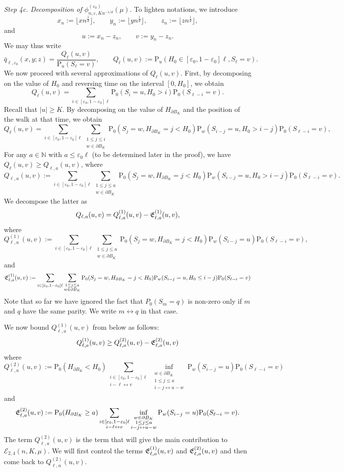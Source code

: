 \documentclass[a4paper,11pt]{amsart}
\numberwithin{equation}{section}
\newcommand{\bbN}{{\ensuremath{\mathbb N}} }
\newcommand{\cE}{{\ensuremath{\mathcal E}} }
\newcommand{\gep}{\varepsilon}
\newcommand{\infthree}[3]{\inf_{\substack{#1 \\ #2\\ #3\\}}} %
\newcommand{\sumtwo}[2]{\sum_{\substack{#1 \\ #2}}} %
\newcommand\bP{\ensuremath{\mathrm{P}}}
\newcommand{\8}{\infty}
\newcommand{\beq}{\begin{equation}}
\newcommand{\eeq}{\end{equation}}
\newcommand{\lra}{\leftrightarrow}
\begin{document}
{\it Step 4c. Decomposition of $\phi^{(\gep_0)}_{n,\gep, Kn^{-1/d}}(\mu)$.}  To lighten notations, we introduce
\beq
x_n := \lfloor xn^{\frac1d} \rfloor, \qquad
y_n := \lfloor yn^{\frac1d} \rfloor, \qquad
z_n := \lfloor zn^{\frac1d} \rfloor,
\eeq
and
\beq
\label{eq:def-uv}
u:= x_n - z_n, \qquad v := y_n- z_n.
\eeq
We may thus write
\beq
\bar q_{\ell,\gep_0}(x,y;z) = \frac{Q_{\ell}(u,v)}{\bP_u(S_\ell = v)},
\qquad Q_{\ell}(u,v):= \bP_u(H_0\in[\gep_0,1-\gep_0]\ell, S_{\ell}= v).
\eeq
We now proceed with several approximations of $Q_{\ell}(u,v)$. First, by decomposing on the value of $H_0$ and reversing time on the interval $[0,H_0]$, we obtain
\beq
Q_{\ell}(u,v) = \sum_{i \in [\gep_0,1-\gep_0]\ell} \bP_0(S_i = u, H_0>i) \bP_0(S_{\ell - i}= v).
\eeq
Recall that $|u|\ge K$. By decomposing on the value of $H_{\partial B_K}$ and the position of the walk at that time, we obtain
\beq
Q_{\ell}(u,v) = \sum_{i \in [\gep_0,1-\gep_0]\ell} \sumtwo{1\le j \le i}{w\in \partial B_K} \bP_0(S_j=w, H_{\partial B_K}=j < H_0)\bP_w(S_{i-j} = u, H_0>i-j) \bP_0(S_{\ell - i}= v),
\eeq
For any $a\in\bbN$ with $a\leq \gep_0\ell$ (to be determined later in the proof), we have $Q_{\ell}(u,v) \ge Q_{\ell,a}(u,v)$, where
\beq
Q_{\ell,a}(u,v) := \sum_{i \in [\gep_0,1-\gep_0]\ell} \sumtwo{1\le j \le a}{w\in \partial B_K} \bP_0(S_j=w, H_{\partial B_K}=j < H_0)\bP_w(S_{i-j} = u, H_0>i-j) \bP_0(S_{\ell - i}= v).
\eeq
We decompose the latter as
\beq
Q_{\ell,a}(u,v) = Q_{\ell,a}^{(1)}(u,v) - {\frak E}_{\ell,a}^{(1)}(u,v),
\eeq
where 
\beq
Q_{\ell,a}^{(1)}(u,v) := \sum_{i \in [\gep_0,1-\gep_0]\ell} \sumtwo{1\le j \le a}{w\in \partial B_K} \bP_0(S_j=w, H_{\partial B_K}=j < H_0)\bP_w(S_{i-j} = u) \bP_0(S_{\ell - i}= v),
\eeq
and
\beq
{\frak E}_{\ell,a}^{(1)}(u,v) := \sum_{i \in [\gep_0,1-\gep_0]\ell} \sumtwo{1\le j \le a}{w\in \partial B_K} \bP_0(S_j=w, H_{\partial B_K}=j < H_0)\bP_w(S_{i-j} = u, H_0 \le i-j) \bP_0(S_{\ell - i}= v)
\eeq
Note that so far we have ignored the fact that $P_0(S_m=q)$ is non-zero only if $m$ and $q$ have the same parity. We write $m\lra q$ in that case.

We now bound $Q_{\ell,a}^{(1)}(u,v)$ from below as follows:
\beq
Q_{\ell,a}^{(1)}(u,v) \ge Q_{\ell,a}^{(2)}(u,v) - {\frak E}_{\ell,a}^{(2)}(u,v)
\eeq
where
\beq
Q_{\ell,a}^{(2)}(u,v) := \bP_0(H_{\partial B_K}< H_0)\sumtwo{i \in [\gep_0,1-\gep_0]\ell}{i-\ell\lra v}
 \infthree{w\in \partial B_K}{1\le j\le a}{i-j\lra u-w}
\bP_w(S_{i-j} = u) \bP_0(S_{\ell - i}= v)
\eeq
and
\beq
{\frak E}_{\ell,a}^{(2)}(u,v) := \bP_0(H_{\partial B_K}\ge a)
\sumtwo{i \in [\gep_0,1-\gep_0]\ell}{i-\ell\lra v}
 \infthree{w\in \partial B_K}{1\le j\le a}{i-j\lra u-w}
\bP_w(S_{i-j} = u) \bP_0(S_{\ell - i}= v).
\eeq
The term $Q_{\ell,a}^{(2)}(u,v)$ is the term that will give the main contribution to $\cE_{2,4}(n,K,\mu)$. We will first control the terms ${\frak E}_{\ell,a}^{(1)}(u,v)$ and ${\frak E}_{\ell,a}^{(2)}(u,v)$ and then come back to $Q_{\ell,a}^{(2)}(u,v)$.\\
\end{document}
